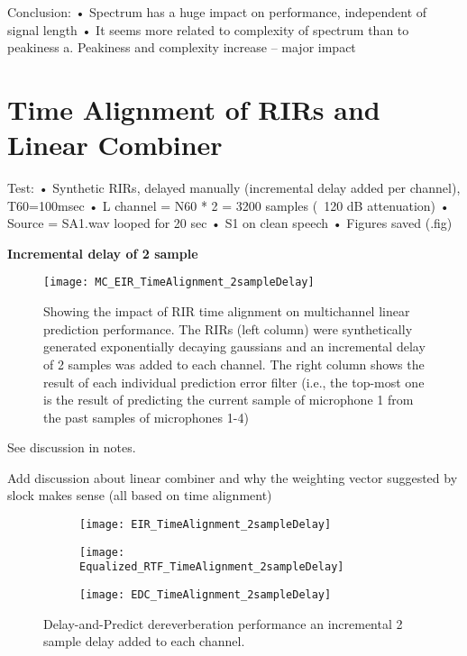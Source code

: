 Conclusion:
•	Spectrum has a huge impact on performance, independent of signal length
•	It seems more related to complexity of spectrum than to peakiness
a.	Peakiness and complexity increase – major impact


\section{Time Alignment of RIRs and Linear Combiner}

Test:
•	Synthetic RIRs, delayed manually (incremental delay added per channel), T60=100msec
•	L channel = N60 * 2 = 3200 samples (~120 dB attenuation)
•	Source = SA1.wav looped for 20 sec
•	S1 on clean speech
•	Figures saved (.fig)

\textbf{Incremental delay of 2 sample}

\begin{figure}[H]
	\texttt{[image: MC\_EIR\_TimeAlignment\_2sampleDelay]}
	\centering
	\caption{Showing the impact of RIR time alignment on multichannel linear prediction performance. The RIRs (left column) were synthetically generated exponentially decaying gaussians and an incremental delay of 2 samples was added to each channel. The right column shows the result of each individual prediction error filter (i.e., the top-most one is the result of predicting the current sample of microphone 1 from the past samples of microphones 1-4)}
	\label{fig:params_MC_EIR_TimeAlignment_2sampleDelay}
\end{figure}

See discussion in notes.

Add discussion about linear combiner and why the weighting vector suggested by slock makes sense (all based on time alignment)

\begin{figure}[H]
	\centering
	\begin{subfigure}[b]{0.32\textwidth}
		\centering
		\texttt{[image: EIR\_TimeAlignment\_2sampleDelay]}
	\end{subfigure}
	\hfill
	\begin{subfigure}[b]{0.32\textwidth}
		\centering
		\texttt{[image: Equalized\_RTF\_TimeAlignment\_2sampleDelay]}
	\end{subfigure}
	\hfill
	\begin{subfigure}[b]{0.32\textwidth}
		\centering
		\texttt{[image: EDC\_TimeAlignment\_2sampleDelay]}
	\end{subfigure}
	\hfill
	\caption{Delay-and-Predict dereverberation performance an incremental 2 sample delay added to each channel.}
	\label{fig:params_TimeAlignment_2sampleDelay}
\end{figure}


